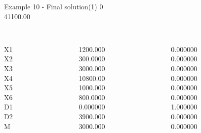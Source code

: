 \begin{frame}{Example 10 - Final solution(1)}
\footnotesize
{}  0\\
  41100.00\\

\begin{columns}[t]
\begin{column}{0.3\textwidth}
\\
X1\\
X2\\
X3\\
X4\\
X5\\
X6\\
D1\\
D2\\
M\\

\end{column}
\begin{column}{0.3\textwidth}
\\
1200.000\\
300.0000\\
3000.000\\
10800.00\\
1000.000\\
800.0000\\
0.000000\\
3900.000\\
3000.000\\

\end{column}  

\begin{column}{0.3\textwidth}
\\
0.000000\\
0.000000\\
0.000000\\
0.000000\\
0.000000\\
0.000000\\
1.000000\\
0.000000\\
0.000000\\
\end{column}
\end{columns}  
\end{frame}


